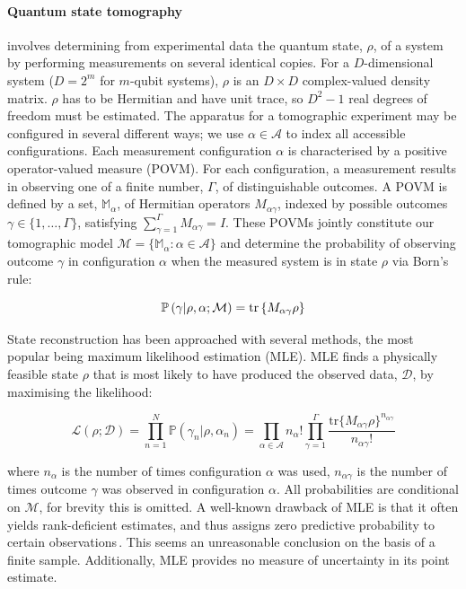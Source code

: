 \documentclass[aps,twocolumn,prl]{revtex4-1}
\newcommand{\param}{{\rho}} \newcommand{\data}{\mathcal{D}}
\newcommand{\config}{\alpha} \newcommand{\configset}{\mathcal{A}}
\newcommand{\outcome}{\gamma} \newcommand{\ie}{i.\,e.\ }
\begin{document}
\paragraph{Quantum state tomography} involves determining from experimental data the quantum state, $\rho$, of a system by performing measurements on several identical copies. For a $D$-dimensional system ($D=2^m$ for $m$-qubit systems), $\rho$ is an $D \times D$ complex-valued density matrix. $\rho$ has to be Hermitian and have unit trace, so $D^2-1$ real degrees of freedom must be estimated. The apparatus for a tomographic experiment may be configured in several different ways; we use $\config\in\configset$ to index all accessible configurations. Each measurement configuration $\config$ is characterised by a positive operator-valued measure (POVM). For each configuration, a measurement results in observing one of a finite number, $\Gamma$, of distinguishable outcomes. A POVM is defined by a set, $\mathbb{M}_{\config}$, of Hermitian operators $M_{\config\outcome}$, indexed by possible outcomes $\outcome\in\{1,\ldots,\Gamma\}$, satisfying $\sum_{\outcome=1}^{\Gamma} M_{\config\outcome} = I$. These POVMs jointly constitute our tomographic model $\mathcal{M}=\{\mathbb{M}_{\config}:\config\in\configset\}$ and determine the probability of observing outcome $\outcome$ in configuration $\config$ when the measured system is in state $\param$ via Born's rule:

\begin{equation}
\mathbb{P}\left(\gamma\vert\param,\config;\mathcal{M}\right) = \text{tr}\left\{M_{\config\outcome}\param \right\}\label{eqn:born}\notag
\end{equation}

State reconstruction has been approached with several methods, the most popular being maximum likelihood estimation (MLE). MLE finds a physically feasible state $\param$ that is most likely to have produced the observed data, $\mathcal{D}$, by maximising the likelihood:

\begin{equation}
\label{eqn:lik}
\mathcal{L}(\rho;\data)=\prod_{n=1}^{N} \mathbb{P}\left(\outcome_n\vert\param,\config_n\right) = \prod_{\config \in \configset}n_{\config}!\prod_{\gamma=1}^{\Gamma}\frac{\mbox{tr}\{M_{\alpha\gamma}\rho\}^{n_{\config\outcome}}}{n_{\config\outcome}!}
\end{equation}

where $n_{\config}$ is the number of times configuration $\config$ was used, $n_{\config\outcome}$ is the number of times outcome $\outcome$ was observed in configuration $\config$. All probabilities are conditional on $\mathcal{M}$, for brevity this is omitted. A well-known drawback of MLE is that it often yields rank-deficient estimates, and thus assigns zero predictive probability to certain observations\,\cite{BayesianTomography}. This seems an unreasonable conclusion on the basis of a finite sample.
Additionally, MLE provides no measure of uncertainty in its point estimate.
\end{document}
